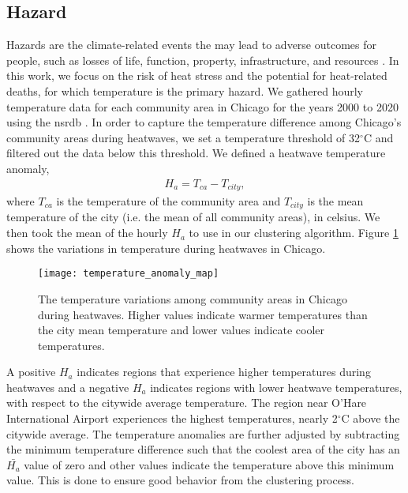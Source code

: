 \subsection{Hazard}

Hazards are the climate-related events the may lead to adverse outcomes for people,
such as losses of life, function, property, infrastructure, and resources
\cite{viner_understanding_2020}. In this work, we focus on the risk of heat stress
and the potential for heat-related deaths, for which temperature is the primary
hazard. We gathered hourly temperature data for each community area in Chicago for the
years 2000 to 2020 using the \ac{nsrdb} \cite{sengupta_national_2018}. In order
to capture the temperature difference among Chicago's community areas during heatwaves,
we set a temperature threshold of 32$^\circ$C and filtered out the data below this
threshold. We defined a heatwave temperature anomaly,
\begin{eqnarray}
  H_a = T_{ca} - T_{city},
\end{eqnarray}
where $T_{ca}$ is the temperature of the community area and $T_{city}$ is the
mean temperature of the city (i.e. the mean of all community areas), in celsius.
We then took the mean of the hourly $H_a$ to use in our clustering algorithm.
Figure \ref{fig:ha_map} shows the variations in temperature during heatwaves in
Chicago.

\begin{figure}[H]
  \label{fig:ha_map}
    \begin{center}
      \texttt{[image: temperature\_anomaly\_map]}
      \vspace*{-2cm}
      \caption{The temperature variations among community areas in Chicago during
      heatwaves. Higher values indicate warmer temperatures than the city mean
      temperature and lower values indicate cooler temperatures.}
    \end{center}
\end{figure}

A positive $H_a$ indicates regions that experience higher temperatures during
heatwaves and a negative $H_a$ indicates regions with lower heatwave temperatures,
with respect to the citywide average temperature.
The region near O'Hare International Airport experiences the highest temperatures,
nearly 2$^\circ$C above the citywide average. The temperature anomalies are further
adjusted by subtracting the minimum temperature difference such that the
coolest area of the city has an $\bar{H_a}$ value of zero and other values indicate
the temperature above this minimum value. This is done to ensure good behavior
from the clustering process.

